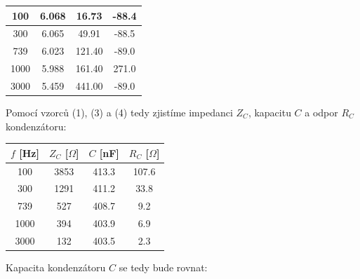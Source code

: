 \documentclass[a4paper,11pt]{article}
\begin{document}
\begin{minipage}[t]{0.5\textwidth}
\begin{tabular}{|c|c|c|c|}
                    \hline
                    100 & 6.068 & 16.73 & -88.4 \\
                    \hline
                    300 & 6.065 & 49.91 & -88.5 \\
                    \hline
                    739 & 6.023 & 121.40 & -89.0 \\
                    \hline
                    1000 & 5.988 & 161.40 & 271.0 \\
                    \hline
                    3000 & 5.459 & 441.00 & -89.0 \\
                    \hline
                \end{tabular}
                \captionsetup{justification=centering, font=footnotesize}
                \vspace{20pt}
                \raggedright
                \par Pomocí vzorců (1), (3) a (4) tedy zjistíme impedanci $Z_C$, kapacitu $C$ a odpor $R_C$ kondenzátoru:
                \vspace{10pt}
                \par \centering
                \begin{tabular}{|c|c|c|c|}
                    \hline
                    $f$ [Hz] & $Z_C$ [$\Omega$] & $C$ [nF] & $R_C$ [$\Omega$] \\
                    \hline
                    100 & 3853 & 413.3 & 107.6 \\
                    \hline
                    300 & 1291 & 411.2 & 33.8 \\
                    \hline
                    739 & 527 & 408.7 & 9.2 \\
                    \hline
                    1000 & 394 & 403.9 & 6.9 \\
                    \hline
                    3000 & 132 & 403.5 & 2.3 \\
                    \hline
                \end{tabular}
                \captionsetup{justification=centering, font=footnotesize}
                \vspace{20pt}
                \raggedright
                \par Kapacita kondenzátoru $C$ se tedy bude rovnat:
                \begin{center}

\end{center}
\end{minipage}
\end{document}
